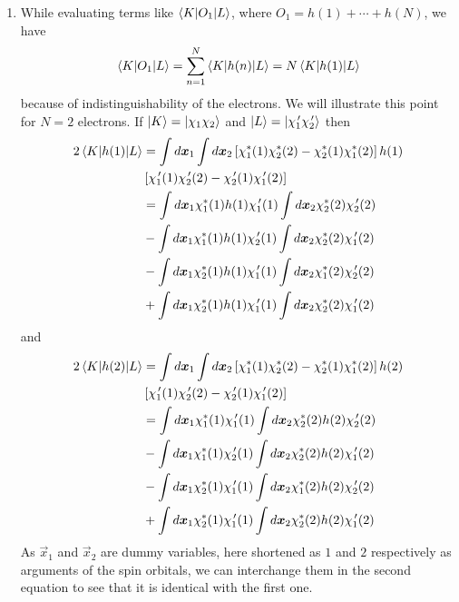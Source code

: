 \begin{enumerate}
We also make a rule that in computing all integrals we will permute the spin
orbitals to get maximum matching while noting that every transposition of spin
orbitals results in flipping the sign of the determinant.

\item\label{c2r2} While evaluating terms like $\braket{K|O_1|L}$, where $O_1 = h(1) + 
\cdots + h(N)$, we have
\begin{equation}\label{c2e94}
\braket{K|O_1|L} = \sum_{n=1}^N\braket{K|h(n)|L} = N\braket{K|h(1)|L}
\end{equation}
because of indistinguishability of the electrons. We will illustrate this point
for $N=2$ electrons. If $\ket{K} = \ket{\chi_1\chi_2}$ and $\ket{L} = \ket{
\chi^{\,\prime}_1\chi^{\,\prime}_2}$ then
\[
\begin{aligned}
2\braket{K|h(1)|L} &= 
\int d\bm{x}_1 \int d\bm{x}_2\left[\chi_1^\ast(1)\chi_2^\ast(2) - 
\chi_2^\ast(1)\chi_1^\ast(2)\right]h(1) \\
 & \left[\chi_1^{\,\prime}(1)\chi_2^{\,\prime}(2) - \chi_2^{\,\prime}(1)\chi_1^{\,\prime}(2)\right] \\
 &=\int d\bm{x}_1\chi_1^\ast(1)h(1)\chi_1^{\,\prime}(1)
 \int d\bm{x}_2\chi_2^\ast(2)\chi_2^{\,\prime}(2) \\
 &-\int d\bm{x}_1\chi_1^\ast(1)h(1)\chi_2^{\,\prime}(1)
 \int d\bm{x}_2\chi_2^\ast(2)\chi_1^{\,\prime}(2) \\
 &-\int d\bm{x}_1\chi_2^\ast(1)h(1)\chi_1^{\,\prime}(1)
 \int d\bm{x}_2\chi_1^\ast(2)\chi_2^{\,\prime}(2) \\ 
 &+\int d\bm{x}_1\chi_2^\ast(1)h(1)\chi_1^{\,\prime}(1)
 \int d\bm{x}_2\chi_2^\ast(2)\chi_1^{\,\prime}(2) 
\end{aligned}
\]
and
\[
\begin{aligned}
2\braket{K|h(2)|L} &= 
\int d\bm{x}_1 \int d\bm{x}_2\left[\chi_1^\ast(1)\chi_2^\ast(2) - 
\chi_2^\ast(1)\chi_1^\ast(2)\right]h(2) \\
 & \left[\chi_1^{\,\prime}(1)\chi_2^{\,\prime}(2) - \chi_2^{\,\prime}(1)\chi_1^{\,\prime}(2)\right] \\
 &=\int d\bm{x}_1\chi_1^\ast(1)\chi_1^{\,\prime}(1)
 \int d\bm{x}_2\chi_2^\ast(2)h(2)\chi_2^{\,\prime}(2) \\
 &-\int d\bm{x}_1\chi_1^\ast(1)\chi_2^{\,\prime}(1)
 \int d\bm{x}_2\chi_2^\ast(2)h(2)\chi_1^{\,\prime}(2) \\
 &-\int d\bm{x}_1\chi_2^\ast(1)\chi_1^{\,\prime}(1)
 \int d\bm{x}_2\chi_1^\ast(2)h(2)\chi_2^{\,\prime}(2) \\ 
 &+\int d\bm{x}_1\chi_2^\ast(1)\chi_1^{\,\prime}(1)
 \int d\bm{x}_2\chi_2^\ast(2)h(2)\chi_1^{\,\prime}(2) 
\end{aligned}
\]
As $\vec{x}_1$ and $\vec{x}_2$ are dummy variables, here shortened as $1$ and
$2$ respectively as arguments of the spin orbitals, we can interchange them in 
the second equation to see that it is identical with the first one.


\end{enumerate}

